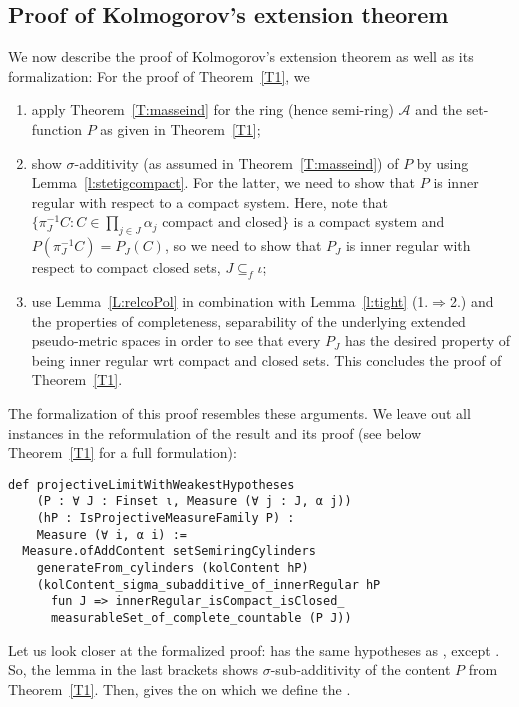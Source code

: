 \documentclass[lean]{DraftAFM}
\begin{document}
\subsection{Proof of Kolmogorov's extension theorem}
We now describe the proof of Kolmogorov's extension theorem as well as
its formalization: For the proof of Theorem~\ref{T1}, we
\begin{enumerate}
  \item apply Theorem~\ref{T:masseind} for the ring (hence semi-ring)
    $\mathcal A$ and the set-function $P$ as given in
    Theorem~\ref{T1};
  \item show $\sigma$-additivity (as assumed in
    Theorem~\ref{T:masseind}) of $P$ by using
    Lemma~\ref{l:stetigcompact}. For the latter, we need to show that
    $P$ is inner regular with respect to a compact system. Here, note
    that $\{\pi_J^{-1}C : C \in \prod_{j\in J} \alpha_j \text{ compact
      and closed}\}$ is a compact system and $P(\pi_J^{-1}C) =
    P_J(C)$, so we need to show that $P_J$ is inner regular with
    respect to compact closed sets, $J\subseteq_f \iota$;
  \item use Lemma~\ref{L:relcoPol} in combination with
    Lemma~\ref{l:tight} (1.$\Rightarrow$2.) and the properties of
    completeness, separability of the underlying extended
    pseudo-metric spaces in order to see that every $P_J$ has the
    desired property of being inner regular wrt compact and closed
    sets. This concludes the proof of Theorem~\ref{T1}.
\end{enumerate}
The formalization of this proof resembles these arguments. We leave
out all instances in the reformulation of the result and its proof
(see below Theorem~\ref{T1} for a full formulation):

\begin{verbatim}
def projectiveLimitWithWeakestHypotheses
    (P : ∀ J : Finset ι, Measure (∀ j : J, α j))
    (hP : IsProjectiveMeasureFamily P) :
    Measure (∀ i, α i) :=
  Measure.ofAddContent setSemiringCylinders
    generateFrom_cylinders (kolContent hP)
    (kolContent_sigma_subadditive_of_innerRegular hP
      fun J => innerRegular_isCompact_isClosed_
      measurableSet_of_complete_countable (P J))
\end{verbatim}
\sloppy Let us look closer at the formalized proof:
 has the
same hypotheses as
,
except . So, the lemma in the last brackets shows
$\sigma$-sub-additivity of the content $P$ from
Theorem~\ref{T1}. Then,  gives
the  on which we define the
.
\end{document}
